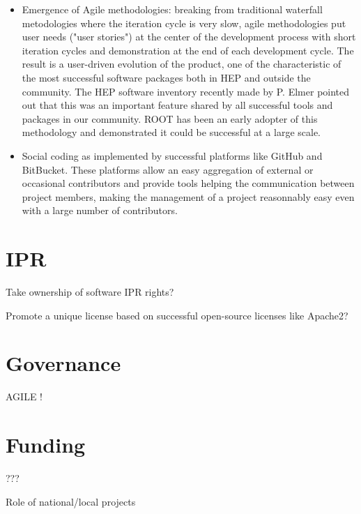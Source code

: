 \documentclass[11pt]{article} %
\begin{document}
\begin{itemize}
\item 
Emergence of Agile methodologies: breaking from traditional
waterfall metodologies where the iteration cycle is very slow, agile
methodologies put user needs ("user stories") at the center of the
development process with short iteration cycles and demonstration
at the end of each development cycle.
The result is a user-driven evolution of the product, one of the
characteristic of the most successful software packages both in HEP
and outside the community. 
The HEP software inventory recently made by P. Elmer pointed out that
this was an important feature shared by all successful tools and
packages in our community.
ROOT has been an early adopter of this methodology and demonstrated
it could be successful at a large scale.

\item 
Social coding as implemented by successful platforms like GitHub and
BitBucket.
These platforms allow an easy aggregation of external or occasional
contributors and provide tools helping the communication between
project members, making the management of a project reasonnably
easy even with a large number of contributors.



\end{itemize}


\section{IPR}

Take ownership of software IPR rights?

Promote a unique license based on successful open-source licenses like
Apache2?

\section{Governance}

AGILE !

\section{Funding}

???

Role of national/local projects
\end{document}
